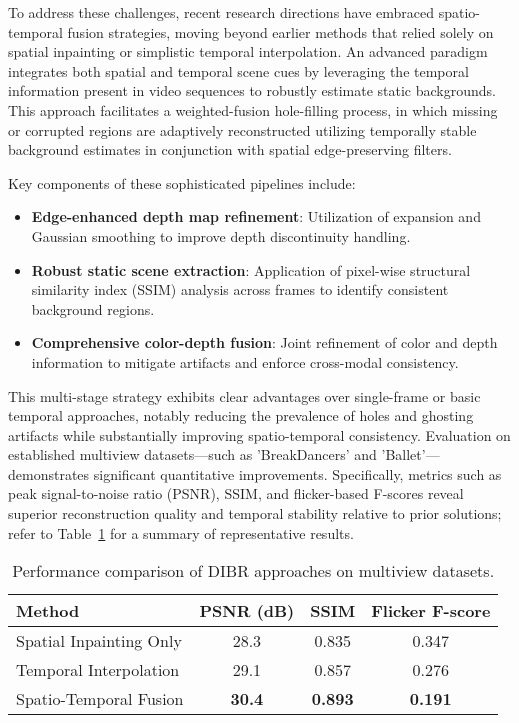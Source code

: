 \documentclass[11pt]{article}
\begin{document}
To address these challenges, recent research directions have embraced spatio-temporal fusion strategies, moving beyond earlier methods that relied solely on spatial inpainting or simplistic temporal interpolation. An advanced paradigm integrates both spatial and temporal scene cues by leveraging the temporal information present in video sequences to robustly estimate static backgrounds. This approach facilitates a weighted-fusion hole-filling process, in which missing or corrupted regions are adaptively reconstructed utilizing temporally stable background estimates in conjunction with spatial edge-preserving filters.

Key components of these sophisticated pipelines include:
\begin{itemize}
    \item \textbf{Edge-enhanced depth map refinement}: Utilization of expansion and Gaussian smoothing to improve depth discontinuity handling.
    \item \textbf{Robust static scene extraction}: Application of pixel-wise structural similarity index (SSIM) analysis across frames to identify consistent background regions.
    \item \textbf{Comprehensive color-depth fusion}: Joint refinement of color and depth information to mitigate artifacts and enforce cross-modal consistency.
\end{itemize}

This multi-stage strategy exhibits clear advantages over single-frame or basic temporal approaches, notably reducing the prevalence of holes and ghosting artifacts while substantially improving spatio-temporal consistency. Evaluation on established multiview datasets—such as 'BreakDancers' and 'Ballet'—demonstrates significant quantitative improvements. Specifically, metrics such as peak signal-to-noise ratio (PSNR), SSIM, and flicker-based F-scores reveal superior reconstruction quality and temporal stability relative to prior solutions; refer to Table~\ref{tab:dibr_performance_comparison} for a summary of representative results.

\begin{table}[ht]
    \centering
    \caption{Performance comparison of DIBR approaches on multiview datasets.}
    \label{tab:dibr_performance_comparison}
    \begin{tabular}{lccc}
        \hline
        \textbf{Method} & \textbf{PSNR (dB)} & \textbf{SSIM} & \textbf{Flicker F-score} \\
        \hline
        Spatial Inpainting Only   & 28.3 & 0.835 & 0.347 \\
        Temporal Interpolation    & 29.1 & 0.857 & 0.276 \\
        Spatio-Temporal Fusion    & \textbf{30.4} & \textbf{0.893} & \textbf{0.191} \\
        \hline
    \end{tabular}
\end{table}
\end{document}
